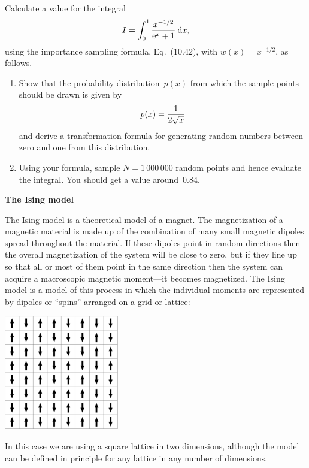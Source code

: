 \documentclass[12pt]{article}
\begin{document}
\begin{exercises}

\exercise Calculate a value for the integral
\begin{displaymath}
I = \int_0^1 {x^{-1/2}\over\mathrm{e}^x + 1}\>\mathrm{d} x,
\end{displaymath}
using the importance sampling formula, Eq.~(10.42), with $w(x)=x^{-1/2}$,
as follows.
\begin{enumerate}\setlength{\itemsep}{0pt}
\item Show that the probability distribution~$p(x)$ from which the sample
  points should be drawn is given by
\begin{displaymath}
p(x) = {1\over2\sqrt{x}}
\end{displaymath}
and derive a transformation formula for generating random numbers between
zero and one from this distribution.
\item Using your formula, sample $N=1\,000\,000$ random points and hence
  evaluate the integral.  You should get a value around~$0.84$.
\end{enumerate}



\exercise \textbf{The Ising model}

\exskip The Ising model is a theoretical
model of a magnet.  The magnetization of a magnetic material is made up of
the combination of many small magnetic dipoles spread throughout the
material.  If these dipoles point in random directions then the overall
magnetization of the system will be close to zero, but if they line up so
that all or most of them point in the same direction then the system can
acquire a macroscopic magnetic moment---it becomes magnetized.  The Ising
model is a model of this process in which the individual moments are
represented by dipoles or ``spins'' arranged on a grid or lattice: \medskip
\begin{center}
\includegraphics[width=5cm]{spins.eps}
\end{center}
In this case we are using a square lattice in two dimensions, although the
model can be defined in principle for any lattice in any number of
dimensions.


\end{exercises}
\end{document}
